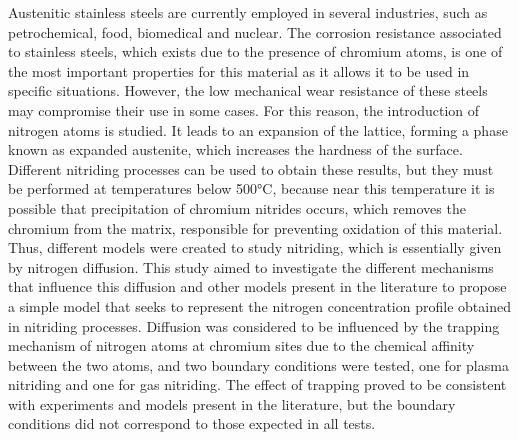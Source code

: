 Austenitic stainless steels are currently employed in several industries, such as petrochemical, food, biomedical and nuclear. The corrosion resistance associated to stainless steels, which exists due to the presence of chromium atoms, is one of the most important properties for this material as it allows it to be used in specific situations. However, the low mechanical wear resistance of these steels may compromise their use in some cases. For this reason, the introduction of nitrogen atoms is studied. It leads to an expansion of the lattice, forming a phase known as expanded austenite, which increases the hardness of the surface. Different nitriding processes can be used to obtain these results, but they must be performed at temperatures below 500°C, because near this temperature it is possible that precipitation of chromium nitrides occurs, which removes the chromium from the matrix, responsible for preventing oxidation of this material. Thus, different models were created to study nitriding, which is essentially given by nitrogen diffusion. This study aimed to investigate the different mechanisms that influence this diffusion and other models present in the literature to propose a simple model that seeks to represent the nitrogen concentration profile obtained in nitriding processes. Diffusion was considered to be influenced by the trapping mechanism of nitrogen atoms at chromium sites due to the chemical affinity between the two atoms, and two boundary conditions were tested, one for plasma nitriding and one for gas nitriding. The effect of trapping proved to be consistent with experiments and models present in the literature, but the boundary conditions did not correspond to those expected in all tests.
